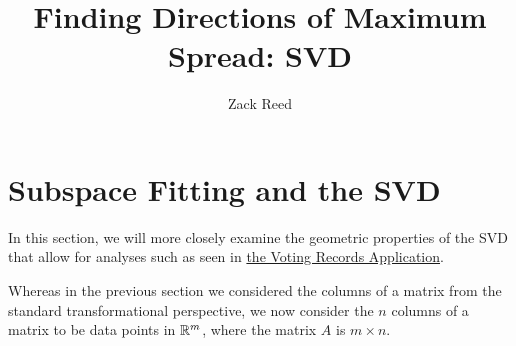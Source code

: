 \documentclass{ximera}
\author{Zack Reed}
\title{Finding Directions of Maximum Spread: SVD}
\begin{document}
\begin{abstract}

\end{abstract}
\maketitle


\section*{Subspace Fitting and the SVD}


In this section, we will more closely examine the geometric properties of the SVD that allow for analyses such as seen in \href{https://ximera.osu.edu/appliedlinearalgebra/c6ChapterSix/learningActivities/m6LearningActivities/leastSquares/leastSquaresApplicationVotingImages}{the Voting Records Application}.

Whereas in the previous section we considered the columns of a matrix from the standard transformational perspective, we now consider the $n$ columns of a matrix to be data points in $\mathbb{R}^m$, where the matrix $A$ is $m\times n$. 
\end{document}
